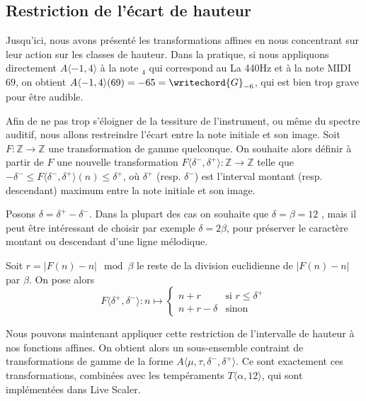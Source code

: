 \subsection{Restriction de l'écart de hauteur}
Jusqu'ici, nous avons présenté les transformations affines en nous concentrant sur leur action sur les classes de hauteur. Dans la pratique, si nous appliquons directement $A\langle -1,4 \rangle$ à la note  $_4$ qui correspond au La 440Hz et à la note MIDI $69$, on obtient $A\langle -1,4 \rangle(69)  = -65 = \writechord{G}_{-6}$, qui est bien trop grave pour être audible. 

Afin de ne pas trop s'éloigner de la tessiture de l'instrument, ou même du spectre auditif, nous allons restreindre l'écart entre la note initiale et son image. Soit $F : \mathbb{Z}\rightarrow \mathbb{Z}$ une transformation de gamme quelconque. On souhaite alors définir à partir de $F$ une nouvelle transformation $F\langle \delta^-, \delta^+\rangle : \mathbb{Z}\rightarrow \mathbb{Z}$ telle que $ - \delta^- \leq F\langle \delta^-, \delta^+\rangle(n) \leq \delta ^+$, où $\delta^+$ (resp. $\delta^-$) est l'interval montant (resp. descendant) maximum entre la note initiale et son image.

Posons $\delta = \delta^+ - \delta^-$.  Dans la plupart des cas on souhaite que $\delta = \beta = 12$ , mais il peut être intéressant de choisir par exemple $\delta  = 2\beta$, pour préserver le caractère montant ou descendant d'une ligne mélodique.

Soit $r = |F(n) - n | \mod \beta$ le reste de la division euclidienne de  $|F(n) - n |$ par $\beta$. On pose alors 
$$
F\langle \delta^+, \delta^- \rangle : n \mapsto \begin{cases}
  n + r & \text{si $r \leq \delta^+$}\\
  n + r - \delta & \text{sinon}
\end{cases}
$$

Nous pouvons maintenant appliquer cette restriction de l'intervalle de hauteur à nos fonctions affines. On obtient alors un sous-ensemble contraint de transformations de gamme de la forme $A\langle \mu, \tau, \delta^-, \delta^+\rangle$. Ce sont exactement ces transformations, combinées avec les tempéraments $T\langle \alpha,12\rangle$, qui sont implémentées dans Live Scaler.
  

